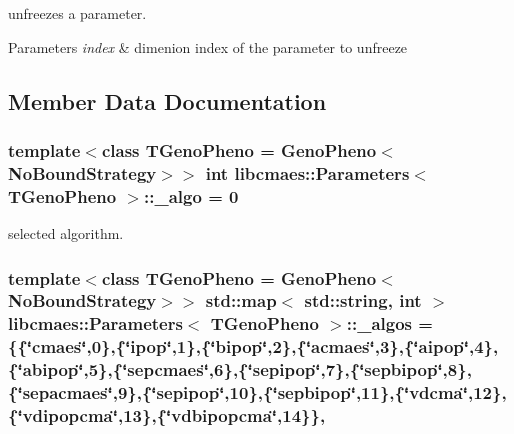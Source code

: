 unfreezes a parameter. 


\begin{DoxyParams}{Parameters}
{\em index} & dimenion index of the parameter to unfreeze \\
\hline
\end{DoxyParams}


\subsection{Member Data Documentation}
\hypertarget{classlibcmaes_1_1Parameters_a7a5fc681b0c7294ef050ace344f923db}{
\subsubsection[{\+\_\+algo}]{\setlength{\rightskip}{0pt plus 5cm}template$<$class T\+Geno\+Pheno = Geno\+Pheno$<$\+No\+Bound\+Strategy$>$$>$ int {\bf libcmaes\+::\+Parameters}$<$ T\+Geno\+Pheno $>$\+::\+\_\+algo = 0\hspace{0.3cm}{\ttfamily [protected]}}}\label{classlibcmaes_1_1Parameters_a7a5fc681b0c7294ef050ace344f923db}
selected algorithm. \hypertarget{classlibcmaes_1_1Parameters_a5d2fd0ca871efd0f4f4b223515544204}{
\subsubsection[{\+\_\+algos}]{\setlength{\rightskip}{0pt plus 5cm}template$<$class T\+Geno\+Pheno = Geno\+Pheno$<$\+No\+Bound\+Strategy$>$$>$ std\+::map$<$ std\+::string, int $>$ {\bf libcmaes\+::\+Parameters}$<$ T\+Geno\+Pheno $>$\+::\+\_\+algos = \{\{\char`\"{}cmaes\char`\"{},0\},\{\char`\"{}ipop\char`\"{},1\},\{\char`\"{}bipop\char`\"{},2\},\{\char`\"{}acmaes\char`\"{},3\},\{\char`\"{}aipop\char`\"{},4\},\{\char`\"{}abipop\char`\"{},5\},\{\char`\"{}sepcmaes\char`\"{},6\},\{\char`\"{}sepipop\char`\"{},7\},\{\char`\"{}sepbipop\char`\"{},8\},\{\char`\"{}sepacmaes\char`\"{},9\},\{\char`\"{}sepipop\char`\"{},10\},\{\char`\"{}sepbipop\char`\"{},11\},\{\char`\"{}vdcma\char`\"{},12\},\{\char`\"{}vdipopcma\char`\"{},13\},\{\char`\"{}vdbipopcma\char`\"{},14\}\}\hspace{0.3cm}{\ttfamily [static]}, {\ttfamily [protected]}}}\label{classlibcmaes_1_1Parameters_a5d2fd0ca871efd0f4f4b223515544204}
